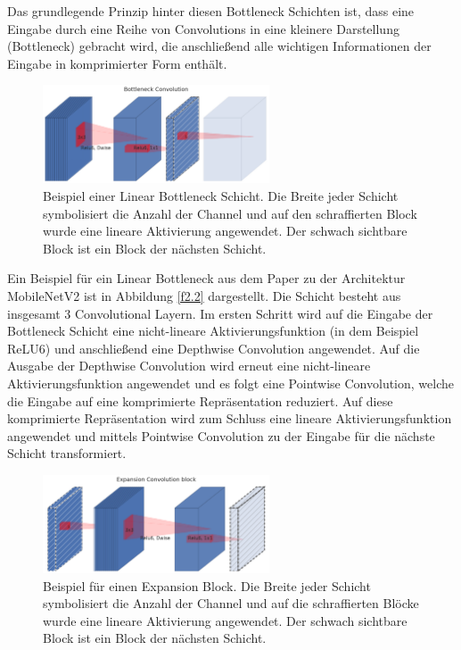 Das grundlegende Prinzip hinter diesen Bottleneck Schichten ist, dass eine Eingabe durch eine Reihe von Convolutions in eine kleinere Darstellung (Bottleneck) gebracht wird, die anschließend alle wichtigen Informationen der Eingabe in komprimierter Form enthält.

\begin{figure}[htbp]
\centerline{\includegraphics[width=0.6\textwidth]{content/images/bottleneck_block.png}}
\caption{Beispiel einer Linear Bottleneck Schicht. Die Breite jeder Schicht symbolisiert die Anzahl der Channel und auf den schraffierten Block wurde eine lineare Aktivierung angewendet. Der schwach sichtbare Block ist ein Block der nächsten Schicht. \cite{sandler_mobilenetv2_2019}}
\label{f2.3}
\end{figure}

Ein Beispiel für ein Linear Bottleneck aus dem Paper zu der Architektur MobileNetV2 \cite{sandler_mobilenetv2_2019} ist in Abbildung \ref{f2.2} dargestellt. Die Schicht besteht aus insgesamt 3 Convolutional Layern. Im ersten Schritt wird auf die Eingabe der Bottleneck Schicht eine nicht-lineare Aktivierungsfunktion (in dem Beispiel ReLU6) und anschließend eine Depthwise Convolution angewendet. Auf die Ausgabe der Depthwise Convolution wird erneut eine nicht-lineare Aktivierungsfunktion angewendet und es folgt eine Pointwise Convolution, welche die Eingabe auf eine komprimierte Repräsentation reduziert. Auf diese komprimierte Repräsentation wird zum Schluss eine lineare Aktivierungsfunktion angewendet und mittels Pointwise Convolution zu der Eingabe für die nächste Schicht transformiert.

\begin{figure}[htbp]
\centerline{\includegraphics[width=0.6\textwidth]{content/images/expansion_block.png}}
\caption{Beispiel für einen Expansion Block. Die Breite jeder Schicht symbolisiert die Anzahl der Channel und auf die schraffierten Blöcke wurde eine lineare Aktivierung angewendet. Der schwach sichtbare Block ist ein Block der nächsten Schicht. \cite{sandler_mobilenetv2_2019}}
\label{f2.4}
\end{figure}

